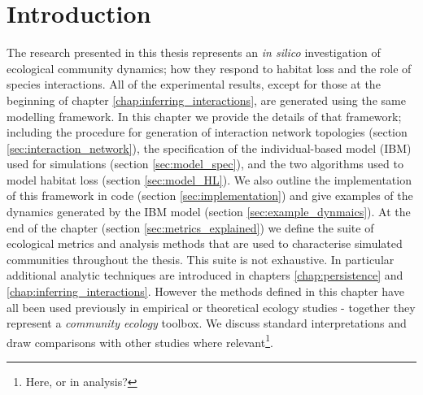 
\section{Introduction}
\label{sec:methods_intro}
The research presented in this thesis represents an \emph{in silico} investigation of ecological community dynamics; how they respond to habitat loss and the role of species interactions. All of the experimental results, except for those at the beginning of chapter \ref{chap:inferring_interactions}, are generated using the same modelling framework. In this chapter we provide the details of that framework; including the procedure for generation of interaction network topologies (section \ref{sec:interaction_network}), the specification of the individual-based model (IBM) used for simulations (section \ref{sec:model_spec}), and the two algorithms used to model habitat loss (section \ref{sec:model_HL}). We also outline the implementation of this framework in code (section \ref{sec:implementation}) and give examples of the dynamics generated by the IBM model (section \ref{sec:example_dynmaics}). At the end of the chapter (section \ref{sec:metrics_explained}) we define the suite of ecological metrics and analysis methods that are used to characterise simulated communities throughout the thesis. This suite is not exhaustive. In particular additional analytic techniques are introduced in chapters \ref{chap:persistence} and \ref{chap:inferring_interactions}. However the methods defined in this chapter have all been used previously in empirical or theoretical ecology studies - together they represent a \emph{community ecology} toolbox. We discuss standard interpretations and draw comparisons with other studies where relevant\footnote{Here, or in analysis?}. 



